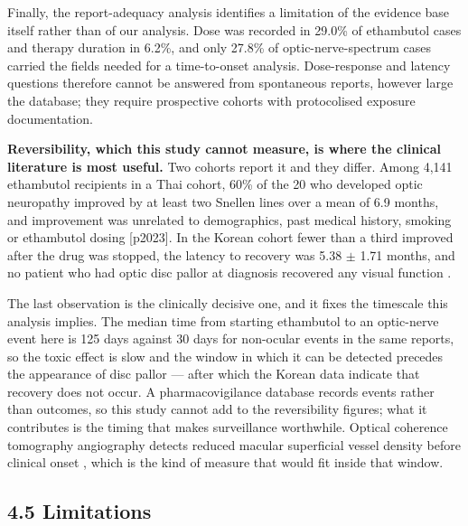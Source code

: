 \documentclass[utf8]{FrontiersinVancouver}
\begin{document}
Finally, the report-adequacy analysis identifies a limitation of the evidence base itself rather than of our analysis. Dose was recorded in 29.0\% of ethambutol cases and therapy duration in 6.2\%, and only 27.8\% of optic-nerve-spectrum cases carried the fields needed for a time-to-onset analysis. Dose-response and latency questions therefore cannot be answered from spontaneous reports, however large the database; they require prospective cohorts with protocolised exposure documentation.

\textbf{Reversibility, which this study cannot measure, is where the clinical literature is most useful.} Two cohorts report it and they differ. Among 4,141 ethambutol recipients in a Thai cohort, 60\% of the 20 who developed optic neuropathy improved by at least two Snellen lines over a mean of 6.9 months, and improvement was unrelated to demographics, past medical history, smoking or ethambutol dosing [p2023]. In the Korean cohort fewer than a third improved after the drug was stopped, the latency to recovery was 5.38 $\pm$ 1.71 months, and no patient who had optic disc pallor at diagnosis recovered any visual function \citep{l2008}.

The last observation is the clinically decisive one, and it fixes the timescale this analysis implies. The median time from starting ethambutol to an optic-nerve event here is 125 days against 30 days for non-ocular events in the same reports, so the toxic effect is slow and the window in which it can be detected precedes the appearance of disc pallor --- after which the Korean data indicate that recovery does not occur. A pharmacovigilance database records events rather than outcomes, so this study cannot add to the reversibility figures; what it contributes is the timing that makes surveillance worthwhile. Optical coherence tomography angiography detects reduced macular superficial vessel density before clinical onset \citep{su2022}, which is the kind of measure that would fit inside that window.

\subsection{4.5 Limitations}
\end{document}
